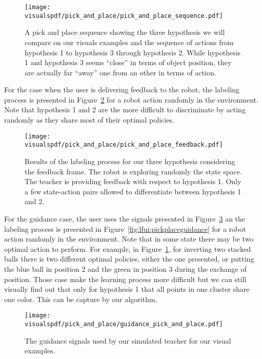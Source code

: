 \begin{figure}[!ht]
  \centering
  \texttt{[image: \\visualspdf/pick\_and\_place/pick\_and\_place\_sequence.pdf]}
  \caption{A pick and place sequence showing the three hypothesis we will compare on our visuals examples and the sequence of actions from hypothesis 1 to hypothesis 3 through hypothesis 2. While hypothesis 1 and hypothesis 3 seems ``close'' in terms of object position, they are actually far ``away'' one from an other in terms of action.}
  \label{fig:lfui:pickplacesequence}
\end{figure}

For the case when the user is delivering feedback to the robot, the labeling process is presented in Figure~\ref{fig:lfui:pickplacefeedback} for a robot action randomly in the environment. Note that hypothesis 1 and 2 are the more difficult to discriminate by acting randomly as they share most of their optimal policies.

\begin{figure}[!ht]
  \centering
  \texttt{[image: \\visualspdf/pick\_and\_place/pick\_and\_place\_feedback.pdf]}
  \caption{Results of the labeling process for our three hypothesis considering the feedback frame. The robot is exploring randomly the state space. The teacher is providing feedback with respect to hypothesis 1. Only a few state-action pairs allowed to differentiate between hypothesis 1 and 2.}
  \label{fig:lfui:pickplacefeedback}
\end{figure}


For the guidance case, the user uses the signals presented in Figure~\ref{fig:lfui:pickplaceguidancesignals} an the labeling process is presented in Figure~\ref{fig:lfui:pickplaceguidance} for a robot action randomly in the environment. Note that in some state there may be two optimal action to perform. For example, in Figure~\ref{fig:lfui:pickplacesequence}, for inverting two stacked balls there is two different optimal policies, either the one presented, or putting the blue ball in position 2 and the green in position 3 during the exchange of position. Those case make the learning process more difficult but we can still visually find out that only for hypothesis 1 that all points in one cluster share one color. This can be capture by our algorithm.

\begin{figure}[!ht]
  \centering
  \texttt{[image: \\visualspdf/pick\_and\_place/guidance\_pick\_and\_place.pdf]}
  \caption{The guidance signals used by our simulated teacher for our visual examples.}
  \label{fig:lfui:pickplaceguidancesignals}
\end{figure}

